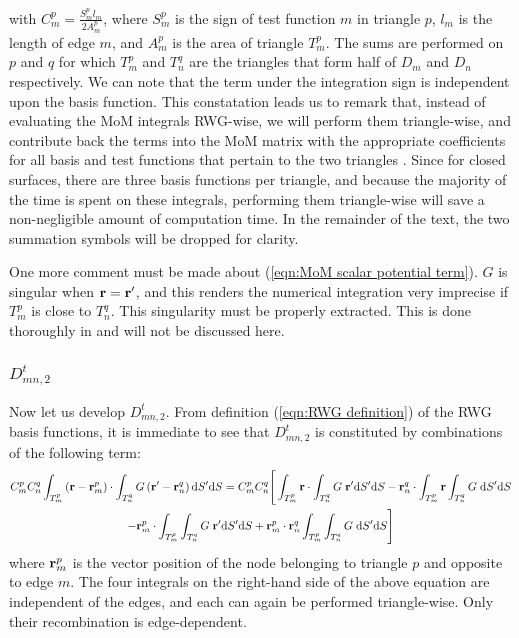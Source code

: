 with $C_m^p = \frac{S_m^p l_m}{2 A_m^p}$, where $S_m^p$ is the sign of test function $m$ in triangle $p$, $l_m$ is the length of edge $m$, and $A_m^p$ is the area of triangle $T_m^p$. The sums are performed on $p$ and $q$ for which $T_m^p$ and $T_n^q$ are the triangles that form half of $D_m$ and $D_n$ respectively. We can note that the term under the integration sign is independent upon the basis function. This constatation leads us to remark that, instead of evaluating the MoM integrals RWG-wise, we will perform them triangle-wise, and contribute back the terms into the MoM matrix with the appropriate coefficients for all basis and test functions that pertain to the two triangles \cite{Rao_82}. Since for closed surfaces, there are three basis functions per triangle, and because the majority of the time is spent on these integrals, performing them triangle-wise will save a non-negligible amount of computation time. In the remainder of the text, the two summation symbols will be dropped for clarity.
%
\par
One more comment must be made about (\ref{eqn:MoM scalar potential term}). $G$ is singular when $\mathbf{r} = \mathbf{r}'$, and this renders the numerical integration very imprecise if $T_m^p$ is close to $T_n^q$. This singularity must be properly extracted. This is done thoroughly in \cite{Taskinen_03} and will not be discussed here.

\subsubsection{$D_{mn,2}^t$}
%
\par
Now let us develop $D_{mn,2}^t$. From definition (\ref{eqn:RWG definition}) of the RWG basis functions, it is immediate to see that $D_{mn,2}^t$ is constituted by combinations of the following term:
\begin{multline}  \label{eqn:MoM vector potential term}
C_m^p C_n^q \int_{T_m^p} \left(\mathbf{r}-\mathbf{r}_m^p \right) \cdot \int_{T_n^q} G \left(\mathbf{r}'-\mathbf{r}_n^q \right) \text{d} S' \text{d} S = C_m^p C_n^q \Bigg[ \int_{T_m^p} \mathbf{r} \cdot \int_{T_n^q} G \; \mathbf{r}' \text{d} S' \text{d} S  - \mathbf{r}_n^q \cdot \int_{T_m^p} \mathbf{r} \int_{T_n^q} G \; \text{d} S' \text{d} S \\
- \mathbf{r}_m^p \cdot \int_{T_m^p} \int_{T_n^q} G \; \mathbf{r}' \text{d} S' \text{d} S + \mathbf{r}_m^p \cdot \mathbf{r}_n^q \int_{T_m^p} \int_{T_n^q} G \; \text{d} S' \text{d} S \Bigg]
\end{multline}
where $\mathbf{r}_m^p$ is the vector position of the node belonging to triangle $p$ and opposite to edge $m$. The four integrals on the right-hand side of the above equation are independent of the edges, and each can again be performed triangle-wise. Only their recombination is edge-dependent.

